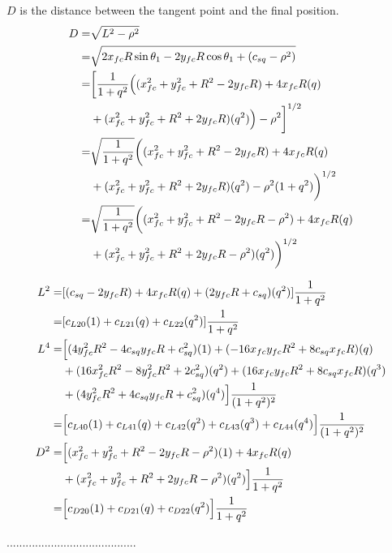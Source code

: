 \documentclass[12pt]{article}
\begin{document}
$D$ is the distance between the tangent point and the final position.
\begin{align}
    D =& \sqrt{L^2 - \rho^2}\\
    =&  \sqrt{2x_{fc}R\sin\theta_1  - 2y_{fc}R\cos\theta_1 + (c_{sq} - \rho^2)} \\
    =& \biggl[ \frac{1}{1+q^2} \Bigl((x_{fc}^2 + y_{fc}^2 + R^2 - 2y_{fc}R) + 4x_{fc}R(q) \nonumber\\&+ (x_{fc}^2 + y_{fc}^2 + R^2 + 2y_{fc}R)(q^2)\Bigr) - \rho^2\biggr]^{1/2}\\
    =& \sqrt{\frac{1}{1+q^2}}\biggl( (x_{fc}^2 + y_{fc}^2 + R^2 - 2y_{fc}R) + 4x_{fc}R(q) \nonumber\\&+ (x_{fc}^2 + y_{fc}^2 + R^2 + 2y_{fc}R)(q^2) - \rho^2(1+q^2)\biggr)^{1/2}\\
    =& \sqrt{\frac{1}{1+q^2}}\biggl( (x_{fc}^2 + y_{fc}^2 + R^2 - 2y_{fc}R - \rho^2) + 4x_{fc}R(q) \nonumber\\&+ (x_{fc}^2 + y_{fc}^2 + R^2 + 2y_{fc}R- \rho^2)(q^2)\biggr)^{1/2}
\end{align}

\begin{align}
    L^2 =& [ (c_{sq} - 2y_{fc}R) + 4x_{fc}R(q)  + (2y_{fc}R+ c_{sq})(q^2)]\frac{1}{1+q^2}\\
    =& [ c_{L20}(1) + c_{L21}(q)  + c_{L22}(q^2)]\frac{1}{1+q^2}\\
    L^4 =& \Bigl[ (4y_{fc}^2R^2 - 4c_{sq}y_{fc}R + c_{sq}^2)(1) +  (- 16x_{fc}y_{fc}R^2 +8c_{sq}x_{fc}R )(q) \nonumber\\
    &+ (16x_{fc}^2R^2 - 8y_{fc}^2R^2 + 2c_{sq}^2)(q^2) + (16x_{fc}y_{fc}R^2 + 8c_{sq}x_{fc}R)(q^3) \nonumber\\
    &+ (4y_{fc}^2R^2 + 4c_{sq}y_{fc}R + c_{sq}^2 )(q^4) \Bigr]\frac{1}{(1+q^2)^2}\\
    =& \Bigl[ c_{L40}(1) +  c_{L41}(q) + c_{L42}(q^2) + c_{L43}(q^3) + c_{L44}(q^4) \Bigr]\frac{1}{(1+q^2)^2}\\
    D^2 =& \Bigl[ (x_{fc}^2 + y_{fc}^2 + R^2 - 2y_{fc}R - \rho^2)(1) + 4x_{fc}R(q) \nonumber\\
    &+ (x_{fc}^2 + y_{fc}^2 + R^2 + 2y_{fc}R- \rho^2)(q^2)\Bigr]\frac{1}{1+q^2}\\
    =& \Bigl[ c_{D20}(1) + c_{D21}(q) + c_{D22}(q^2)\Bigr]\frac{1}{1+q^2}
\end{align}

.........................................
\end{document}
